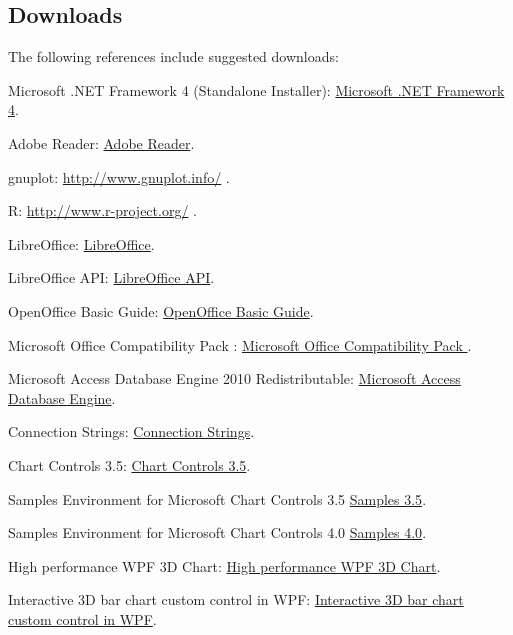 \subsection{Downloads}
The following references include suggested downloads:

Microsoft .NET Framework 4 (Standalone Installer): \href{http://www.microsoft.com/en-us/download/details.aspx?id=17718}{Microsoft .NET Framework 4}.

Adobe Reader: \href{http://get.adobe.com/uk/reader/}{Adobe Reader}.

gnuplot: \href{http://www.gnuplot.info/}{http://www.gnuplot.info/} .

R: \href{http://www.r-project.org/}{http://www.r-project.org/} .

LibreOffice: \href{http://www.libreoffice.org/}{LibreOffice}.

LibreOffice API: \href{http://api.libreoffice.org/}{LibreOffice API}.

OpenOffice Basic Guide: \href{http://wiki.openoffice.org/wiki/Documentation/BASIC_Guide}{OpenOffice Basic Guide}.

Microsoft Office Compatibility Pack : \href{http://www.microsoft.com/en-us/download/details.aspx?id=3}{Microsoft Office Compatibility Pack }.

Microsoft Access Database Engine 2010 Redistributable: \href{http://www.microsoft.com/en-us/download/details.aspx?id=13255}{Microsoft Access Database Engine}.

Connection Strings: \href{http://www.connectionstrings.com/}{Connection Strings}.

Chart Controls 3.5: \href{http://www.microsoft.com/en-us/download/details.aspx?id=14422}{Chart Controls 3.5}.

Samples Environment for Microsoft Chart Controls 3.5 \href{http://archive.msdn.microsoft.com/mschart/Release/ProjectReleases.aspx?ReleaseId=1591}{Samples 3.5}.

Samples Environment for Microsoft Chart Controls 4.0 \href{http://archive.msdn.microsoft.com/mschart/Release/ProjectReleases.aspx?ReleaseId=4418}{Samples 4.0}.

High performance WPF 3D Chart: \href{http://www.codeproject.com/Articles/42174/High-performance-WPF-D-Chart}{High performance WPF 3D Chart}.

Interactive 3D bar chart custom control in WPF: \href{http://www.codeproject.com/Articles/29151/Interactive-D-bar-chart-custom-control-in-WPF-wit}{Interactive 3D bar chart custom control in WPF}.

